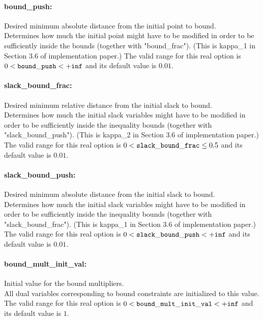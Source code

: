 \paragraph{bound\_push:}\label{opt:bound_push} Desired minimum absolute distance from the initial point to bound. \\
 Determines how much the initial point might have to be modified in order to be sufficiently inside the bounds (together with "bound\_frac").  (This is kappa\_1 in Section 3.6 of implementation paper.) The valid range for this real option is 
$0 <  {\tt bound\_push } <  {\tt +inf}$
and its default value is $0.01$.


\paragraph{slack\_bound\_frac:}\label{opt:slack_bound_frac} Desired minimum relative distance from the initial slack to bound. \\
 Determines how much the initial slack variables might have to be modified in order to be sufficiently inside the inequality bounds (together with "slack\_bound\_push").  (This is kappa\_2 in Section 3.6 of implementation paper.) The valid range for this real option is 
$0 <  {\tt slack\_bound\_frac } \le 0.5$
and its default value is $0.01$.


\paragraph{slack\_bound\_push:}\label{opt:slack_bound_push} Desired minimum absolute distance from the initial slack to bound. \\
 Determines how much the initial slack variables might have to be modified in order to be sufficiently inside the inequality bounds (together with "slack\_bound\_frac").  (This is kappa\_1 in Section 3.6 of implementation paper.) The valid range for this real option is 
$0 <  {\tt slack\_bound\_push } <  {\tt +inf}$
and its default value is $0.01$.


\paragraph{bound\_mult\_init\_val:}\label{opt:bound_mult_init_val} Initial value for the bound multipliers. \\
 All dual variables corresponding to bound constraints are initialized to this value. The valid range for this real option is 
$0 <  {\tt bound\_mult\_init\_val } <  {\tt +inf}$
and its default value is $1$.


